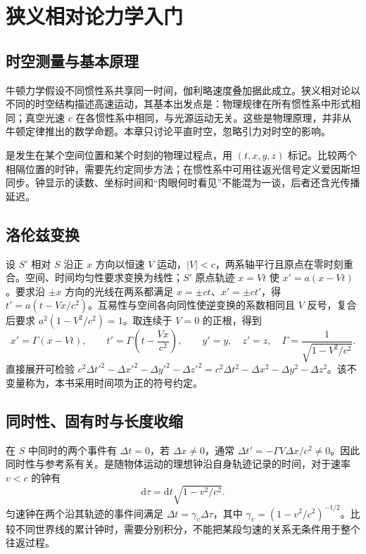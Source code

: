 \documentclass[UTF8,12pt,a4paper,fontset=fandol]{ctexbook}
\begin{document}
\chapter{狭义相对论力学入门}
\label{chap:mech-relativity}

\section{时空测量与基本原理}
牛顿力学假设不同惯性系共享同一时间，伽利略速度叠加据此成立。狭义相对论以不同的时空结构描述高速运动，其基本出发点是：物理规律在所有惯性系中形式相同；真空光速 $c$ 在各惯性系中相同，与光源运动无关。这些是物理原理，并非从牛顿定律推出的数学命题。本章只讨论平直时空，忽略引力对时空的影响。

是发生在某个空间位置和某个时刻的物理过程点，用 $(t,x,y,z)$ 标记。比较两个相隔位置的时钟，需要先约定同步方法；在惯性系中可用往返光信号定义爱因斯坦同步。钟显示的读数、坐标时间和“肉眼何时看见”不能混为一谈，后者还含光传播延迟。

\section{洛伦兹变换}
设 $S'$ 相对 $S$ 沿正 $x$ 方向以恒速 $V$ 运动，$|V|<c$，两系轴平行且原点在零时刻重合。空间、时间均匀性要求变换为线性；$S'$ 原点轨迹 $x=Vt$ 使 $x'=a(x-Vt)$。要求沿 $\pm x$ 方向的光线在两系都满足 $x=\pm ct$、$x'=\pm ct'$，得 $t'=a(t-Vx/c^2)$。互易性与空间各向同性使逆变换的系数相同且 $V$ 反号，复合后要求 $a^2(1-V^2/c^2)=1$。取连续于 $V=0$ 的正根，得到
\begin{equation}
 x'=\Gamma(x-Vt),\qquad t'=\Gamma\left(t-\frac{Vx}{c^2}\right),\qquad
 y'=y,\quad z'=z,\quad \Gamma=\frac1{\sqrt{1-V^2/c^2}}.
 \label{eq:mech-lorentz}
\end{equation}
直接展开可检验 $c^2\Delta t'^2-\Delta x'^2-\Delta y'^2-\Delta z'^2=c^2\Delta t^2-\Delta x^2-\Delta y^2-\Delta z^2$。该不变量称为，本书采用时间项为正的符号约定。

\section{同时性、固有时与长度收缩}
在 $S$ 中同时的两个事件有 $\Delta t=0$，若 $\Delta x\ne0$，通常 $\Delta t'=-\Gamma V\Delta x/c^2\ne0$。因此同时性与参考系有关。是随物体运动的理想钟沿自身轨迹记录的时间，对于速率 $v<c$ 的钟有
\begin{equation}
 \mathrm d\tau=\mathrm dt\sqrt{1-v^2/c^2}.
 \label{eq:mech-proper-time}
\end{equation}
匀速钟在两个沿其轨迹的事件间满足 $\Delta t=\gamma_v\Delta\tau$，其中 $\gamma_v=(1-v^2/c^2)^{-1/2}$。比较不同世界线的累计钟时，需要分别积分，不能把某段匀速的关系无条件用于整个往返过程。
\end{document}
